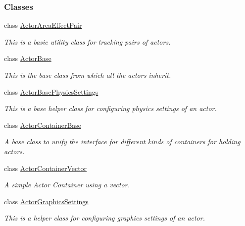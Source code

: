 \subsubsection*{Classes}
\begin{DoxyCompactItemize}
\item 
class \hyperlink{classMezzanine_1_1ActorAreaEffectPair}{ActorAreaEffectPair}
\begin{DoxyCompactList}\small\item\em This is a basic utility class for tracking pairs of actors. \item\end{DoxyCompactList}\item 
class \hyperlink{classMezzanine_1_1ActorBase}{ActorBase}
\begin{DoxyCompactList}\small\item\em This is the base class from which all the actors inherit. \item\end{DoxyCompactList}\item 
class \hyperlink{classMezzanine_1_1ActorBasePhysicsSettings}{ActorBasePhysicsSettings}
\begin{DoxyCompactList}\small\item\em This is a base helper class for configuring physics settings of an actor. \item\end{DoxyCompactList}\item 
class \hyperlink{classMezzanine_1_1ActorContainerBase}{ActorContainerBase}
\begin{DoxyCompactList}\small\item\em A base class to unify the interface for different kinds of containers for holding actors. \item\end{DoxyCompactList}\item 
class \hyperlink{classMezzanine_1_1ActorContainerVector}{ActorContainerVector}
\begin{DoxyCompactList}\small\item\em A simple Actor Container using a vector. \item\end{DoxyCompactList}\item 
class \hyperlink{classMezzanine_1_1ActorGraphicsSettings}{ActorGraphicsSettings}
\begin{DoxyCompactList}\small\item\em This is a helper class for configuring graphics settings of an actor. \item\end{DoxyCompactList}\item 

\end{DoxyCompactItemize}
